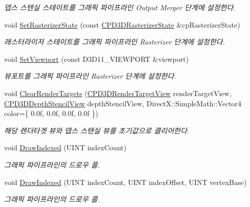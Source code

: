 \begin{DoxyCompactItemize}
\begin{DoxyCompactList}\small\item\em 뎁스 스텐실 스테이트를 그래픽 파이프라인 Output Merger 단계에 설정한다. \end{DoxyCompactList}\item 
void \hyperlink{class_m_n_l_1_1_mn_render_a_p_i_a6bda2a793330625a9afd6e488decd198}{Set\+Rasterizer\+State} (const \hyperlink{namespace_m_n_l_aa6c2682c64c5b58c458c36bb424f1e56}{C\+P\+D3\+D\+Rasterizer\+State} \&cp\+Rasterizer\+State)
\begin{DoxyCompactList}\small\item\em 래스터라이저 스테이트를 그래픽 파이프라인 Rasterizer 단계에 설정한다. \end{DoxyCompactList}\item 
void \hyperlink{class_m_n_l_1_1_mn_render_a_p_i_aec7697c401d411b4fc83268b4d98d9c3}{Set\+Viewport} (const D3\+D11\+\_\+\+V\+I\+E\+W\+P\+O\+RT \&viewport)
\begin{DoxyCompactList}\small\item\em 뷰포트를 그래픽 파이프라인 Rasterizer 단계에 설정한다. \end{DoxyCompactList}\item 
void \hyperlink{class_m_n_l_1_1_mn_render_a_p_i_ac132e08f4e5508d45bdf9e4a9cce0eeb}{Clear\+Render\+Targets} (\hyperlink{namespace_m_n_l_aa08a7c0b5ac9d877dacb57b9306b7b8c}{C\+P\+D3\+D\+Render\+Target\+View} render\+Target\+View, \hyperlink{namespace_m_n_l_a12b3c209d76ede855300e637f4192a04}{C\+P\+D3\+D\+Depth\+Stencil\+View} depth\+Stencil\+View, Direct\+X\+::\+Simple\+Math\+::\+Vector4 color=\{ 0.\+0f, 0.\+0f, 0.\+0f, 0.\+0f \})
\begin{DoxyCompactList}\small\item\em 해당 렌더타겟 뷰와 뎁스 스텐실 뷰를 초기값으로 클리어한다. \end{DoxyCompactList}\item 
void \hyperlink{class_m_n_l_1_1_mn_render_a_p_i_a1d1a5e917ca1719432ce326a101a0cdd}{Draw\+Indexed} (U\+I\+NT index\+Count)
\begin{DoxyCompactList}\small\item\em 그래픽 파이프라인의 드로우 콜. \end{DoxyCompactList}\item 
void \hyperlink{class_m_n_l_1_1_mn_render_a_p_i_ad02c10333d786fdce01af16c265244ea}{Draw\+Indexed} (U\+I\+NT index\+Count, U\+I\+NT index\+Offset, U\+I\+NT vertex\+Base)
\begin{DoxyCompactList}\small\item\em 그래픽 파이프라인의 드로우 콜. \end{DoxyCompactList}\item 

\end{DoxyCompactItemize}
